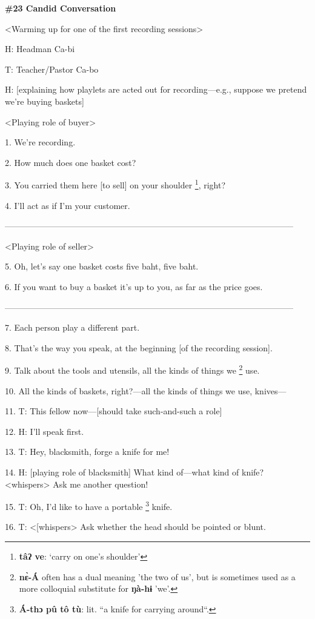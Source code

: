 
\textbf{\#23 Candid Conversation}

<Warming up for one of the first recording sessions>

H: Headman Ca-bi

T: Teacher/Pastor Ca-bo

H: [explaining how playlets are acted out for recording---e.g., suppose we pretend
we're buying baskets]

<Playing role of buyer>

1. We're recording.

2. How much does one basket cost?

3. You carried them here [to sell] on your shoulder \footnote{\textbf{tâʔ ve}: `carry on one's shoulder'}, right?

4. I'll act as if I'm your customer.

------------------------------------------------------------------------------------------------------

<Playing role of seller>

5. Oh, let's say one basket costs five baht, five baht.

6. If you want to buy a basket it's up to you, as far as the price goes.

------------------------------------------------------------------------------------------------------

7. Each person play a different part.

8. That's the way you speak, at the beginning [of the recording session].

9. Talk about the tools and utensils, all the kinds of things we \footnote{\textbf{nɛ̀-Á}  often has a dual meaning 'the two of us', but is sometimes used as a more colloquial substitute for  \textbf{ŋà-hɨ}  'we'.} use.

10. All the kinds of baskets, right?---all the kinds of things we use, knives---

11. T: This fellow now---[should take such-and-such a role]

12. H: I'll speak first.

13. T: Hey, blacksmith, forge a knife for me!

14. H: [playing role of blacksmith] What kind of---what kind of knife? <whispers>
Ask me another question!

15. T: Oh, I'd like to have a portable \footnote{\textbf{ Á-thɔ pû tô tù}: lit. ``a knife for carrying around``.} knife.

16.  T: <[whispers> Ask whether the head should be pointed or
blunt.

